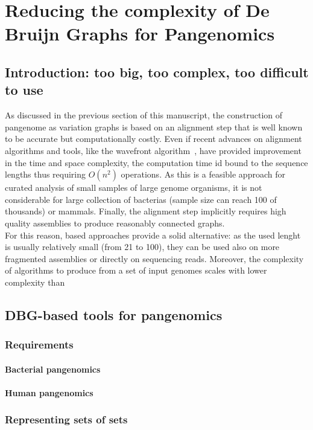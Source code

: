 \chapter{Reducing the complexity of De Bruijn Graphs for Pangenomics}
\label{sec:complexity}

\section{Introduction: too big, too complex, too difficult to use}
As discussed in the previous section of this manuscript, the  construction of pangenome as variation graphs is based on an alignment step that is well known to be accurate but computationally costly. Even if recent advances on alignment algorithms and tools, like the wavefront algorithm~\cite{wavefront}, have provided improvement in the time and space complexity, the computation time id bound to the sequence lengths thus requiring $O(n^2)$ operations. As this is a feasible approach for curated analysis of small samples of large genome organisms, it is not considerable for large collection of bacterias (sample size can reach 100 of thousands) or mammals. Finally, the alignment step implicitly requires high quality assemblies to produce reasonably connected graphs.\\
For this reason, \kmer based approaches provide a solid alternative: as the used \kmer lenght is usually relatively small (from 21 to 100), they can be used also on more fragmented assemblies or directly on sequencing reads. Moreover, the complexity of algorithms to produce \ccdbg from a set of input genomes scales with lower complexity than 

\section{DBG-based tools for pangenomics}

\subsection{Requirements}
\subsubsection{Bacterial pangenomics}
\subsubsection{Human pangenomics}

\subsection{Representing sets of \kmer sets}

